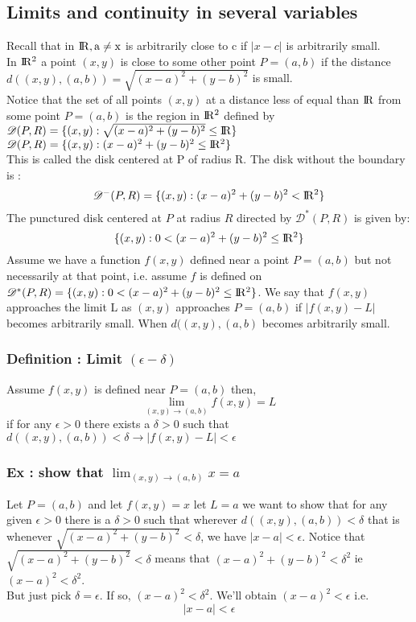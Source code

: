 \documentclass[12pt, letterpaper, twoside]{article}
\newcommand{\real}{\rm I\!R}
\newcommand{\domain}{\mathscr{D}}
\begin{document}
\subsection*{Limits and continuity in several variables}
Recall that in $\real, a \neq x$ is arbitrarily close to c if $| x-c |$ is arbitrarily small.\\
In $\real^2$ a point $(x,y)$ is close to some other point $P=(a,b)$ if the distance $d((x,y),(a,b)) = \sqrt{(x-a)^2+(y-b)^2}$ is small.\\
Notice that the set of all points $(x,y)$ at a distance less of equal than $\real$ from some point $P=(a,b)$ is the region in $\real^2$ defined by $\domain(P,R)=\{(x,y) : \sqrt{(x-a)^2+(y-b)^2} \leq \real\}$\\
$\domain(P,R)= \{ (x,y) : (x-a)^2+(y-b)^2 \leq \real^2\}$\\
This is called the disk centered at P of radius R. The disk without the boundary is :
$$\domain^-(P,R)=\{(x,y): (x-a)^2+(y-b)^2<\real^2\}$$
The punctured disk centered at $P$ at radius $R$ directed by $\domain^*(P,R)$ is given by: 
$$\{(x,y): 0<(x-a)^2+(y-b)^2 \leq \real^2\}$$
Assume we have a function $f(x,y)$ defined near a point $P=(a,b)$ but not necessarily at that point, i.e. assume $f$ is defined on $\domain^*(P,R) = \{(x,y):0<(x-a)^2+(y-b)^2 \leq \real^2\}$. We say that $f(x,y)$ approaches the limit L as $(x,y)$ approaches $P=(a,b)$ if $|f(x,y) - L|$ becomes arbitrarily small. When $d((x,y),(a,b)$ becomes arbitrarily small.\\

\subsubsection*{Definition : Limit $(\epsilon - \delta)$}
Assume $f(x,y)$ is defined near $P=(a,b)$ then,
$$\lim_{(x,y) \to (a,b)} f(x,y) = L$$
if for any $\epsilon > 0$ there exists a $\delta > 0$ such that $d((x,y),(a,b)) < \delta \rightarrow |f(x,y) - L| < \epsilon$

\subsubsection*{Ex : show that $\lim_{(x,y) \to (a,b)} x = a$}
Let $P=(a,b)$ and let $f(x,y)=x$ let $L=a$ we want to show that for any given $\epsilon>0$ there is a $\delta>0$ such that wherever $d((x,y),(a,b))<\delta$ that is whenever $\sqrt{(x-a)^2+(y-b)^2} < \delta$, we have $|x-a| < \epsilon$. Notice that $\sqrt{(x-a)^2+(y-b)^2} < \delta$ means that $(x-a)^2+(y-b)^2 < \delta^2$ ie $(x-a)^2<\delta^2$.\\
But just pick $\delta=\epsilon$. If so, $(x-a)^2<\delta^2$. We'll obtain $(x-a)^2<\epsilon$ i.e.
$$|x-a|<\epsilon$$
\end{document}
